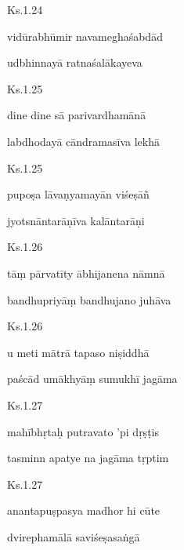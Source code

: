 \documentclass{tufte-handout}
\newenvironment{sanskrit}%
{\begin{otherlanguage}{sanskrit-devanagari}}%
{\end{otherlanguage}}
\begin{document}
    
	\begin{sanskrit}
	
	    
		Ks.1.24 
    
	    
		vidūrabhūmir navameghaśabdād 
    
	    
		udbhinnayā ratnaśalākayeva 
    
	\end{sanskrit}

    
	\begin{sanskrit}
	
	    
		Ks.1.25 
    
	    
		dine dine sā parivardhamānā 
    
	    
		labdhodayā cāndramasīva lekhā 
    
	\end{sanskrit}

    
	\begin{sanskrit}
	
	    
		Ks.1.25 
    
	    
		pupoṣa lāvaṇyamayān viśeṣāñ 
    
	    
		jyotsnāntarāṇīva kalāntarāṇi 
    
	\end{sanskrit}

    
	\begin{sanskrit}
	
	    
		Ks.1.26 
    
	    
		tāṃ pārvatīty ābhijanena nāmnā 
    
	    
		bandhupriyāṃ bandhujano juhāva 
    
	\end{sanskrit}

    
	\begin{sanskrit}
	
	    
		Ks.1.26 
    
	    
		u meti mātrā tapaso niṣiddhā 
    
	    
		paścād umākhyāṃ sumukhī jagāma 
    
	\end{sanskrit}

    
	\begin{sanskrit}
	
	    
		Ks.1.27 
    
	    
		mahībhṛtaḥ putravato 'pi dṛṣṭis 
    
	    
		tasminn apatye na jagāma tṛptim 
    
	\end{sanskrit}

    
	\begin{sanskrit}
	
	    
		Ks.1.27 
    
	    
		anantapuṣpasya madhor hi cūte 
    
	    
		dvirephamālā saviśeṣasaṅgā 
    
	\end{sanskrit}
\end{document}
